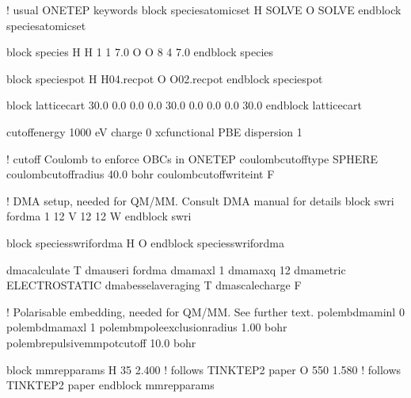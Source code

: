 \documentclass[letterpaper,10pt,english]{sphinxmanual}
\begin{document}
\begin{sphinxVerbatim}[commandchars=\\\{\}]
! \PYGZhy{}\PYGZhy{}\PYGZhy{} usual ONETEP keywords \PYGZhy{}\PYGZhy{}\PYGZhy{}
\PYGZpc{}block species\PYGZus{}atomic\PYGZus{}set
H  \PYGZdq{}SOLVE\PYGZdq{}
O  \PYGZdq{}SOLVE\PYGZdq{}
\PYGZpc{}endblock species\PYGZus{}atomic\PYGZus{}set

\PYGZpc{}block species
H  H 1 1 7.0
O  O 8 4 7.0
\PYGZpc{}endblock species

\PYGZpc{}block species\PYGZus{}pot
H  \PYGZsq{}H\PYGZus{}04.recpot\PYGZsq{}
O  \PYGZsq{}O\PYGZus{}02.recpot\PYGZsq{}
\PYGZpc{}endblock species\PYGZus{}pot

\PYGZpc{}block lattice\PYGZus{}cart
30.0  0.0  0.0
 0.0 30.0  0.0
 0.0  0.0 30.0
\PYGZpc{}endblock lattice\PYGZus{}cart

cutoff\PYGZus{}energy 1000 eV
charge 0
xc\PYGZus{}functional PBE
dispersion 1

! \PYGZhy{}\PYGZhy{}\PYGZhy{} cutoff Coulomb to enforce OBCs in ONETEP \PYGZhy{}\PYGZhy{}\PYGZhy{}
coulomb\PYGZus{}cutoff\PYGZus{}type SPHERE
coulomb\PYGZus{}cutoff\PYGZus{}radius 40.0 bohr
coulomb\PYGZus{}cutoff\PYGZus{}write\PYGZus{}int F

! \PYGZhy{}\PYGZhy{}\PYGZhy{} DMA setup, needed for QM/MM. Consult DMA manual for details \PYGZhy{}\PYGZhy{}\PYGZhy{}
\PYGZpc{}block swri
  for\PYGZus{}dma 1 12 V 12 12 W
\PYGZpc{}endblock swri

\PYGZpc{}block species\PYGZus{}swri\PYGZhy{}for\PYGZus{}dma
H
O
\PYGZpc{}endblock species\PYGZus{}swri\PYGZhy{}for\PYGZus{}dma

dma\PYGZus{}calculate T
dma\PYGZus{}use\PYGZus{}ri for\PYGZus{}dma
dma\PYGZus{}max\PYGZus{}l 1
dma\PYGZus{}max\PYGZus{}q 12
dma\PYGZus{}metric ELECTROSTATIC
dma\PYGZus{}bessel\PYGZus{}averaging T
dma\PYGZus{}scale\PYGZus{}charge F

! \PYGZhy{}\PYGZhy{}\PYGZhy{} Polarisable embedding, needed for QM/MM. See further text. \PYGZhy{}\PYGZhy{}\PYGZhy{}
pol\PYGZus{}emb\PYGZus{}dma\PYGZus{}min\PYGZus{}l 0
pol\PYGZus{}emb\PYGZus{}dma\PYGZus{}max\PYGZus{}l 1
pol\PYGZus{}emb\PYGZus{}mpole\PYGZus{}exclusion\PYGZus{}radius 1.00 bohr
pol\PYGZus{}emb\PYGZus{}repulsive\PYGZus{}mm\PYGZus{}pot\PYGZus{}cutoff 10.0 bohr

\PYGZpc{}block mm\PYGZus{}rep\PYGZus{}params
H   35 2.400 ! follows TINKTEP\PYGZhy{}2 paper
O  550 1.580 ! follows TINKTEP\PYGZhy{}2 paper
\PYGZpc{}endblock mm\PYGZus{}rep\PYGZus{}params
\end{sphinxVerbatim}
\end{document}
